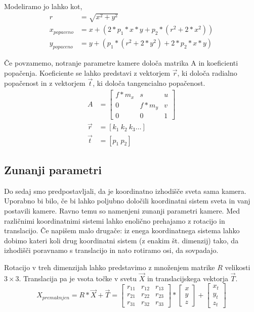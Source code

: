 \documentclass[a4paper, 12pt]{book}
\begin{document}
Modeliramo jo lahko kot,
\begin{align}
r &= \sqrt{x^2 + y^2} \\
x_{popaceno} &= x + (2 * p_1 * x * y + p_2 * (r^2 + 2 * x^2)) \\
y_{popaceno} &= y + (p_1 * (r^2 + 2*y^2) + 2 * p_2 * x * y)
\end{align}

Če povzamemo, notranje parametre kamere določa matrika A in koeficienti popačenja. Koeficiente se lahko predstavi z vektorjem $\vec{r}$, ki določa radialno popačenost in z vektorjem $\vec{t}$, ki določa tangencialno popačenost.
\begin{align*}
A &= 
\begin{bmatrix}
f*m_x & s & u \\
0 & f*m_y & v \\
0 & 0 & 1
\end{bmatrix} \\
\vec{r} &= [k_1 \ k_2 \ k_3 \dots] \\
\vec{t} &= [p_1 \ p_2]
\end{align*}

\subsection{Zunanji parametri}
Do sedaj smo predpostavljali, da je koordinatno izhodišče sveta sama kamera. Uporabno bi bilo, če bi lahko poljubno določili koordinatni sistem sveta in vanj postavili kamere. Ravno temu so namenjeni zunanji parametri kamere. Med različnimi koordinatnimi sistemi lahko enolično prehajamo z rotacijo in translacijo. Če napišem malo drugače: iz enega koordinatnega sistema lahko dobimo kateri koli drug koordinatni sistem (z enakim št. dimenzij) tako, da izhodišči poravnamo s translacijo in nato rotiramo osi, da sovpadajo. 

Rotacijo v treh dimenzijah lahko predstavimo z množenjem matrike $R$ velikosti $3 \times 3$. Translacija pa je vsota točke v svetu $\vec{X}$ in translacijskega vektorja $\vec{T}$.
\begin{equation}
X_{premaknjen} = R * \vec{X} + \vec{T} = 
\begin{bmatrix}
r_{11} & r_{12} & r_{13} \\
r_{21} & r_{22} & r_{23} \\
r_{31} & r_{32} & r_{33}
\end{bmatrix}
* 
\begin{bmatrix}
x \\
y \\
z 
\end{bmatrix}
+
\begin{bmatrix}
x_t \\
y_t \\
z_t 
\end{bmatrix}
\label{coordeq}
\end{equation}
\end{document}
